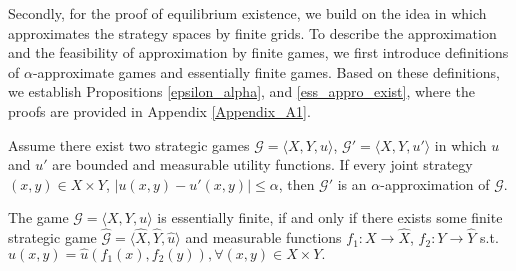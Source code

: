 Secondly, for the proof of equilibrium existence, we build on the idea in \citep{Myerson1991GameT} which approximates the strategy spaces by finite grids. To describe the approximation and the feasibility of approximation by finite games, we first introduce definitions of $\alpha$-approximate games and essentially finite games. Based on these definitions, we establish Propositions \ref{epsilon_alpha}, and \ref{ess_appro_exist}, where the proofs are provided in Appendix \ref{Appendix_A1}.
\begin{definition}{}
    Assume there exist two strategic games $\mathcal{G}=\langle X, Y, u \rangle$, $\mathcal{G}'= \langle  X, Y,  u' \rangle$ in which $u$ and $u'$ are bounded and measurable utility functions. If every joint strategy $(x, y) \in X \times Y$, $|u(x, y)-u'(x, y)| \leq \alpha$, then $\mathcal{G}'$ is an $\alpha$-approximation of $\mathcal{G}$. 
\end{definition}
\begin{definition}{}
    The game $\mathcal{G} = \langle X, Y, u \rangle$ is essentially finite, if and only if there exists some finite strategic game $\hat{\mathcal{G}} = \langle \hat{X}, \hat{Y},  \hat{u} \rangle$ and measurable functions $f_1: X \rightarrow \hat{X}$, $f_2: Y \rightarrow \hat{Y}$ s.t. $u(x, y) = \hat{u}(f_1(x), f_2(y)), \forall (x, y) \in X \times Y.$

\end{definition}


